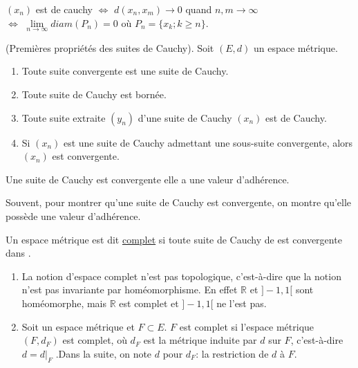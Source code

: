 \documentclass[12pt,a4paper]{article}
\begin{document}
\begin{flushleft}
\begin{rem}
$(x_n)$ est de cauchy $\Leftrightarrow$ $d(x_n, x_m) \longrightarrow 0$ quand $n,m \longrightarrow \infty$\\$\Leftrightarrow$ $\lim\limits_{n \rightarrow \infty} diam (P_n) = 0$ où $P_n =  \{x_k ; k \geq n\}$.
\end{rem}

\begin{prop}
(Premières propriétés des suites de Cauchy). Soit $(E,d)$ un espace métrique.
\begin{enumerate}
\item Toute suite convergente est une suite de Cauchy.
\item Toute suite de Cauchy est bornée.
\item Toute suite extraite $(y_n)$ d'une suite de Cauchy $(x_n)$ est de Cauchy.
\item Si $(x_n)$ est une suite de Cauchy admettant une sous-suite convergente, alors $(x_n)$ est convergente.
\end{enumerate}
\end{prop}

\begin{cor}
Une suite de Cauchy est convergente \ssi elle a une valeur d'adhérence.
\end{cor}


\begin{rem} 
Souvent, pour montrer qu'une suite de Cauchy est convergente, on montre qu'elle possède une valeur d'adhérence.
\end{rem}

\begin{mydef} 
Un espace métrique \edm est dit \underline{complet} si toute suite de Cauchy de \edm est convergente dans \edm.
\end{mydef}

\begin{rem} 
\begin{enumerate}
\item La notion d'espace complet n'est pas topologique, c'est-à-dire que la notion n'est pas invariante par homéomorphisme. En effet $\mathbb{R}$ et $]-1,1[$ sont homéomorphe, mais $\mathbb{R}$ est complet et  $]-1,1[$ ne l'est pas.
\item Soit \edm un espace métrique et $F \subset E$. $F$ est complet si l'espace métrique $(F, d_F)$ est complet, où $d_F$ est la métrique induite par $d$ sur $F$, c'est-à-dire $d = d|_F$ .Dans la suite, on note $d$ pour $d_F$: la restriction de $d$ à $F$.
\end{enumerate}
\end{rem}


\end{flushleft}
\end{document}
